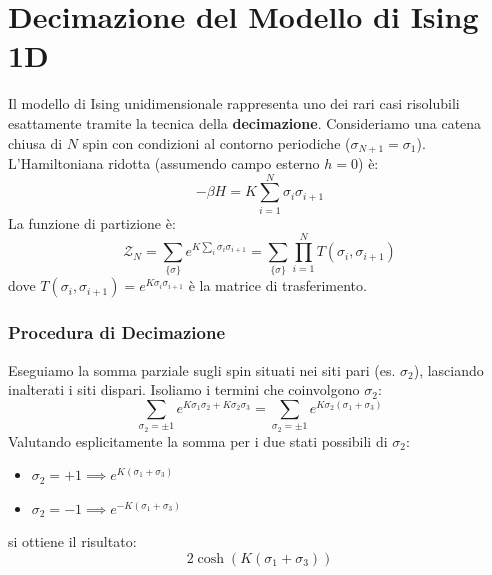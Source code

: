 \section{Decimazione del Modello di Ising 1D}
\label{sec:decimazione}

Il modello di Ising unidimensionale rappresenta uno dei rari casi risolubili esattamente tramite la tecnica della \textbf{decimazione}.
Consideriamo una catena chiusa di $N$ spin con condizioni al contorno periodiche ($\sigma_{N+1} = \sigma_1$).  L'Hamiltoniana ridotta (assumendo campo esterno $h=0$) è:
\begin{equation}
    -\beta H = K \sum_{i=1}^N \sigma_i \sigma_{i+1}
\end{equation}
La funzione di partizione è:
\begin{equation}
    \mathcal{Z}_N = \sum_{\{\sigma\}} e^{K \sum_i \sigma_i \sigma_{i+1}} = \sum_{\{\sigma\}} \prod_{i=1}^N T(\sigma_i, \sigma_{i+1})
\end{equation}
dove $T(\sigma_i, \sigma_{i+1}) = e^{K \sigma_i \sigma_{i+1}}$ è la matrice di trasferimento.

\subsubsection{Procedura di Decimazione}
Eseguiamo la somma parziale sugli spin situati nei siti pari (es. $\sigma_2$), lasciando inalterati i siti dispari. Isoliamo i termini che coinvolgono $\sigma_2$:
\begin{equation}
    \sum_{\sigma_2 = \pm 1} e^{K \sigma_1 \sigma_2 + K \sigma_2 \sigma_3} = \sum_{\sigma_2 = \pm 1} e^{K \sigma_2 (\sigma_1 + \sigma_3)}
\end{equation}
Valutando esplicitamente la somma per i due stati possibili di $\sigma_2$:
\begin{itemize}
    \item $\sigma_2 = +1 \implies e^{K(\sigma_1 + \sigma_3)}$
    \item $\sigma_2 = -1 \implies e^{-K(\sigma_1 + \sigma_3)}$
\end{itemize}
si ottiene il risultato:
\begin{equation}
    2 \cosh(K(\sigma_1 + \sigma_3))
\end{equation}

\hfill

